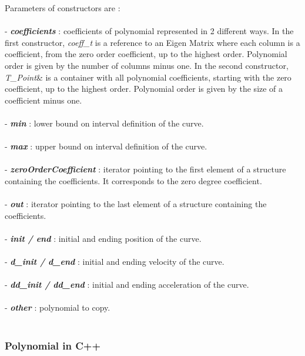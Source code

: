 \documentclass{article}
\begin{document}
    Parameters of constructors are :\\\\
    - \textbf{\textit{coefficients}} : coefficients of polynomial represented in 2 different ways. In the first constructor, \textit{coeff\_t} is a reference to an Eigen Matrix where each column is a coefficient, from the zero order coefficient, up to the highest order. Polynomial order is given by the number of columns minus one. In the second constructor, \textit{T\_Point}\& is a container with all polynomial coefficients, starting with the zero coefficient, up to the highest order. Polynomial order is given by the size of a coefficient minus one.\\\\
    - \textbf{\textit{min}} : lower bound on interval definition of the curve.\\\\
    - \textbf{\textit{max}} : upper bound on interval definition of the curve.\\\\
    - \textbf{\textit{zeroOrderCoefficient}} : iterator pointing to the first element of a structure containing the coefficients. It corresponds to the zero degree coefficient.\\\\
    - \textbf{\textit{out}} : iterator pointing to the last element of a structure containing the coefficients.\\\\
    - \textbf{\textit{init / end}} : initial and ending position of the curve.\\\\
    - \textbf{\textit{d\_init / d\_end}} : initial and ending velocity of the curve.\\\\
    - \textbf{\textit{dd\_init / dd\_end}} : initial and ending acceleration of the curve.\\\\
    - \textbf{\textit{other}} : polynomial to copy.\\\\

    \subsubsection{Polynomial in C++}
\end{document}
